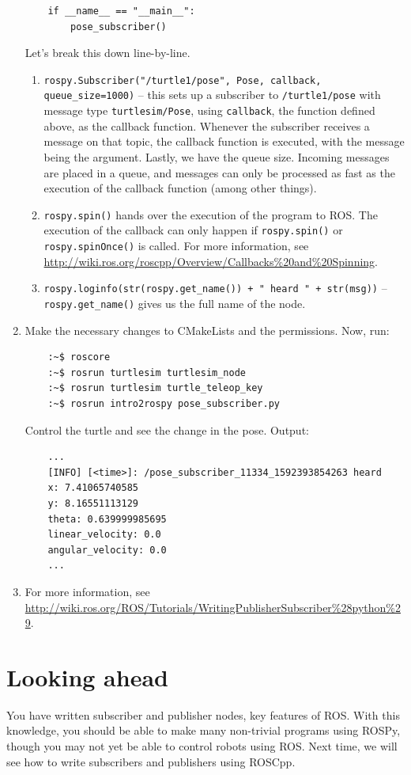 \documentclass{article}
\begin{document}
\begin{enumerate}
\begin{verbatim}
    if __name__ == "__main__":
        pose_subscriber()
        \end{verbatim}
        Let's  break this down line-by-line.
        \begin{enumerate}
            \item \texttt{rospy.Subscriber("/turtle1/pose", Pose, callback, queue_size=1000)}
            -- this sets up a subscriber to \texttt{/turtle1/pose} with message type 
            \texttt{turtlesim/Pose}, using \texttt{callback}, the function defined above, as 
            the callback function. Whenever the subscriber receives a message on that
            topic, the callback function is executed, with the message being the argument. Lastly,
            we have the queue size. Incoming messages are placed in a queue, and messages can only 
            be processed as fast as the execution of the callback function (among other things).
            \item \texttt{rospy.spin()} hands over the execution of the program to ROS.
            The execution of the callback can only happen if \texttt{rospy.spin()} or 
            \texttt{rospy.spinOnce()} is called. For more information, see 
            \url{http://wiki.ros.org/roscpp/Overview/Callbacks%20and%20Spinning}.
            \item \texttt{rospy.loginfo(str(rospy.get_name()) + " heard " + str(msg))} -- 
            \texttt{rospy.get\_name()} gives us the full name of the node.
        \end{enumerate}
        \item Make the necessary changes to CMakeLists and the permissions. Now, run:
        \begin{verbatim}
    :~$ roscore
    :~$ rosrun turtlesim turtlesim_node 
    :~$ rosrun turtlesim turtle_teleop_key
    :~$ rosrun intro2rospy pose_subscriber.py
        \end{verbatim}
        Control the turtle and see the change in the pose. Output:
        \begin{verbatim}
    ...    
    [INFO] [<time>]: /pose_subscriber_11334_1592393854263 heard 
    x: 7.41065740585
    y: 8.16551113129
    theta: 0.639999985695
    linear_velocity: 0.0
    angular_velocity: 0.0
    ...
        \end{verbatim}
    \item For more information, see \url{http://wiki.ros.org/ROS/Tutorials/WritingPublisherSubscriber%28python%29}.
    \end{enumerate}
    \section{Looking ahead}
    You have written subscriber and publisher nodes, key features of ROS. With this knowledge,
    you should be able to make many non-trivial programs using ROSPy, though you may not yet be 
    able to control robots using ROS. Next time, we will see how to write subscribers and publishers 
    using ROSCpp.
\end{document}
